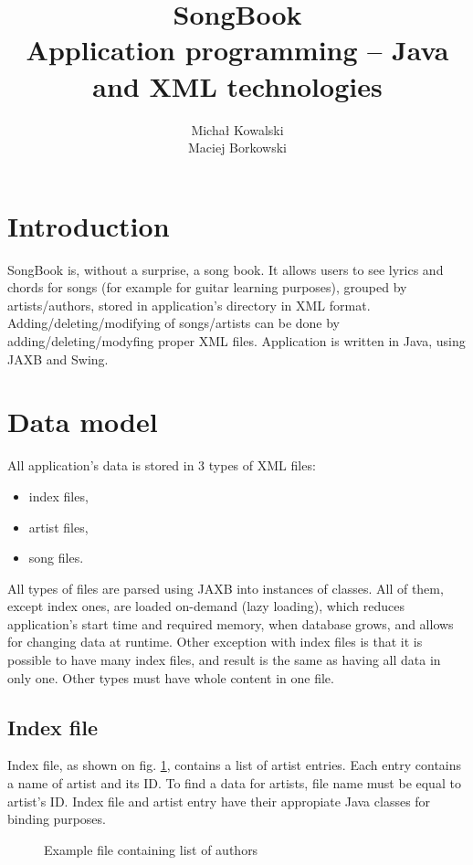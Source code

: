 \documentclass[titlepage]{article}
\title{SongBook\\ \large Application programming – Java and XML technologies}
\author{Michał Kowalski\\Maciej Borkowski}
\date{}
\begin{document}
\maketitle

\section{Introduction}
SongBook is, without a surprise, a song book. It allows users to see lyrics and
chords for songs (for example for guitar learning purposes), grouped by
artists/authors, stored in application's directory in XML format. Adding/deleting/modifying of songs/artists can be done by
adding/deleting/modyfing proper XML files. Application is written in Java, using
JAXB and Swing.

\section{Data model}
All application's data is stored in 3 types of XML files:
\begin{itemize}
  \item index files,
  \item artist files,
  \item song files.
\end{itemize}
All types of files are parsed using JAXB into instances of classes. All of them,
except index ones, are loaded on-demand (lazy loading), which reduces application's start time and required memory, when database grows, and allows
for changing data at runtime. Other exception with index files is that it is
possible to have many index files, and result is the same as having all data in
only one. Other types must have whole content in one file. 

\subsection{Index file}
Index file, as shown on fig. \ref{lst:index}, contains a list of artist entries.
Each entry contains a name of artist and its ID. To find a data for artists,
file name must be equal to artist's ID. Index file and artist entry have their
appropiate Java classes for binding purposes.

\begin{figure}

\caption{Example file containing list of authors}
\label{lst:index}
\end{figure}
\end{document}
